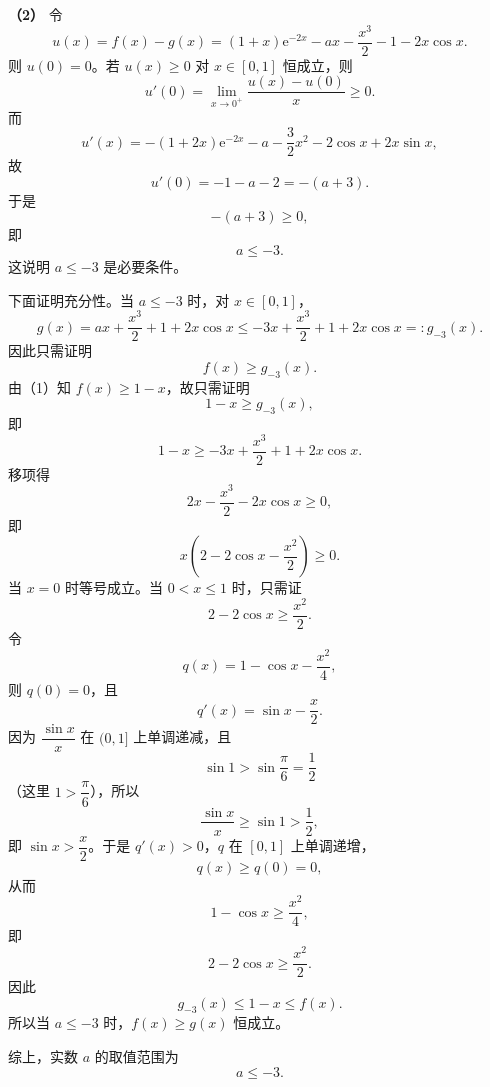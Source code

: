 \begin{answer}
\textbf{（2）} 令
\nopagebreak[4]
\[u(x)=f(x)-g(x)=(1+x)\mathrm e^{-2x}-ax-\frac{x^3}2-1-2x\cos x.\]
则 $u(0)=0$。若 $u(x)\geqslant0$ 对 $x\in[0,1]$ 恒成立，则
\nopagebreak[4]
\[u'(0)=\lim_{x\to0^+}\frac{u(x)-u(0)}x\geqslant0.\]
而
\nopagebreak[4]
\[u'(x)=-(1+2x)\mathrm e^{-2x}-a-\frac32x^2-2\cos x+2x\sin x,\]
故
\nopagebreak[4]
\[u'(0)=-1-a-2=-(a+3).\]
于是
\nopagebreak[4]
\[-(a+3)\geqslant0,\]
即
\nopagebreak[4]
\[a\leqslant-3.\]
这说明 $a\leqslant-3$ 是必要条件。

下面证明充分性。当 $a\leqslant-3$ 时，对 $x\in[0,1]$，
\nopagebreak[4]
\[g(x)=ax+\frac{x^3}2+1+2x\cos x
\leqslant-3x+\frac{x^3}2+1+2x\cos x=:g_{-3}(x).\]
因此只需证明
\nopagebreak[4]
\[f(x)\geqslant g_{-3}(x).\]
由（1）知 $f(x)\geqslant1-x$，故只需证明
\nopagebreak[4]
\[1-x\geqslant g_{-3}(x),\]
即
\nopagebreak[4]
\[1-x\geqslant-3x+\frac{x^3}2+1+2x\cos x.\]
移项得
\nopagebreak[4]
\[2x-\frac{x^3}2-2x\cos x\geqslant0,\]
即
\nopagebreak[4]
\[x\left(2-2\cos x-\frac{x^2}2\right)\geqslant0.\]
当 $x=0$ 时等号成立。当 $0<x\leqslant1$ 时，只需证
\nopagebreak[4]
\[2-2\cos x\geqslant\frac{x^2}2.\]
令
\nopagebreak[4]
\[q(x)=1-\cos x-\frac{x^2}4,\]
则 $q(0)=0$，且
\nopagebreak[4]
\[q'(x)=\sin x-\frac x2.\]
因为 $\dfrac{\sin x}{x}$ 在 $(0,1]$ 上单调递减，且
\nopagebreak[4]
\[\sin1>\sin\frac{\pi}6=\frac12\]
（这里 $1>\dfrac{\pi}6$），所以
\nopagebreak[4]
\[\frac{\sin x}{x}\geqslant\sin1>\frac12,\]
即 $\sin x>\dfrac x2$。于是 $q'(x)>0$，$q$ 在 $[0,1]$ 上单调递增，
\nopagebreak[4]
\[q(x)\geqslant q(0)=0,\]
从而
\nopagebreak[4]
\[1-\cos x\geqslant\frac{x^2}4,\]
即
\nopagebreak[4]
\[2-2\cos x\geqslant\frac{x^2}2.\]
因此
\nopagebreak[4]
\[g_{-3}(x)\leqslant1-x\leqslant f(x).\]
所以当 $a\leqslant-3$ 时，$f(x)\geqslant g(x)$ 恒成立。

综上，实数 $a$ 的取值范围为
\nopagebreak[4]
\[a\leqslant-3.\]



\end{answer}
